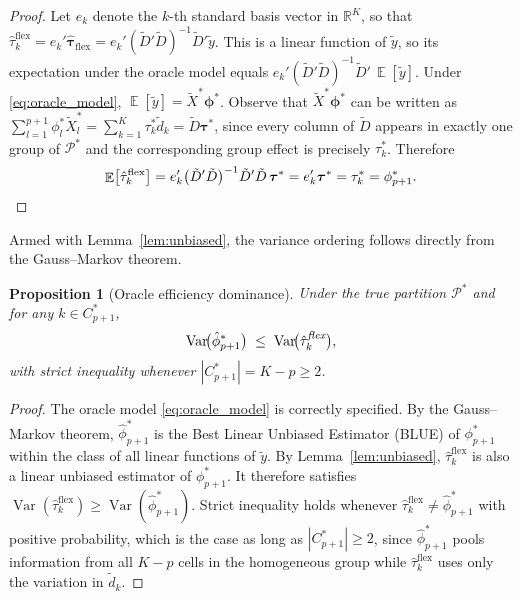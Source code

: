 \documentclass[12pt]{article}
\newtheorem{proposition}{Proposition}
\DeclareMathOperator{\E}{\mathbb{E}}
\DeclareMathOperator{\Var}{Var}
\newcommand{\1}{\mathbbm{1}}
\newcommand{\ytd}{\tilde{y}}
\newcommand{\Dtd}{\tilde{D}}
\newcommand{\Xtd}{\tilde{X}}
\begin{document}
\begin{proof}
Let $e_k$ denote the $k$-th standard basis vector in $\mathbb{R}^K$, so
that $\hat\tau_k^{\text{flex}} = e_k'\hat{\bm{\tau}}_{\text{flex}} =
e_k'(\Dtd'\Dtd)^{-1}\Dtd'\ytd$.
This is a linear function of $\ytd$, so its expectation under the oracle
model equals $e_k'(\Dtd'\Dtd)^{-1}\Dtd'\,\E[\ytd]$.
Under \eqref{eq:oracle_model}, $\E[\ytd] = \Xtd^*\bm{\phi}^*$.
Observe that $\Xtd^*\bm{\phi}^*$ can be written as
$\sum_{l=1}^{p+1}\phi_l^* \Xtd_l^* = \sum_{k=1}^K \tau_k^* \tilde{d}_k =
\Dtd\bm{\tau}^*$, since every column of $\Dtd$ appears in exactly one
group of $\mathcal{P}^*$ and the corresponding group effect is precisely
$\tau_k^*$.  Therefore
\[
  \E\bigl[\hat\tau_k^{\text{flex}}\bigr]
  = e_k'\bigl(\Dtd'\Dtd\bigr)^{-1}\Dtd'\Dtd\,\bm{\tau}^*
  = e_k'\bm{\tau}^* = \tau_k^* = \phi_{p+1}^*. \qedhere
\]
\end{proof}

\noindent Armed with Lemma~\ref{lem:unbiased}, the variance ordering follows
directly from the Gauss--Markov theorem.

\begin{proposition}[Oracle efficiency dominance]
  \label{prop:oracle_dom}
  Under the true partition $\mathcal{P}^*$ and for any $k \in C_{p+1}^*$,
  \begin{equation}
    \Var\!\bigl(\hat\phi_{p+1}^*\bigr)
    \;\leq\;
    \Var\!\bigl(\hat\tau_k^{\emph{flex}}\bigr),
    \label{eq:var_ineq}
  \end{equation}
  with strict inequality whenever $|C_{p+1}^*| = K - p \geq 2$.
\end{proposition}

\begin{proof}
The oracle model \eqref{eq:oracle_model} is correctly specified.
By the Gauss--Markov theorem, $\hat\phi_{p+1}^*$ is the Best Linear
Unbiased Estimator (BLUE) of $\phi_{p+1}^*$ within the class of all
linear functions of $\ytd$.
By Lemma~\ref{lem:unbiased}, $\hat\tau_k^{\text{flex}}$ is also a linear
unbiased estimator of $\phi_{p+1}^*$.
It therefore satisfies $\Var(\hat\tau_k^{\text{flex}}) \geq
\Var(\hat\phi_{p+1}^*)$.
Strict inequality holds whenever $\hat\tau_k^{\text{flex}} \neq
\hat\phi_{p+1}^*$ with positive probability, which is the case as long as
$|C_{p+1}^*| \geq 2$, since $\hat\phi_{p+1}^*$ pools information from all
$K-p$ cells in the homogeneous group while $\hat\tau_k^{\text{flex}}$
uses only the variation in $\tilde{d}_k$.
\end{proof}
\end{document}
